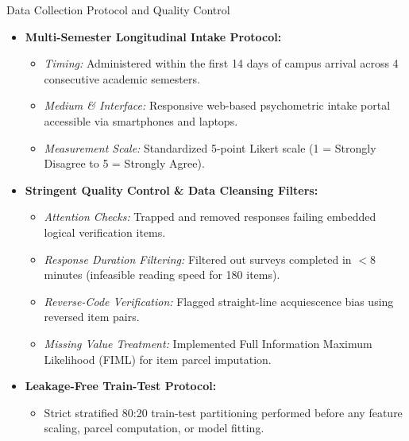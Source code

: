 \documentclass{beamer}
\begin{document}
\begin{frame}[t]{Data Collection Protocol and Quality Control}
  \begin{itemize}\setlength{\itemsep}{6pt}\small
    \item \textbf{Multi-Semester Longitudinal Intake Protocol:}
    \begin{itemize}\setlength{\itemsep}{2pt}\footnotesize
      \item \textit{Timing:} Administered within the first 14 days of campus arrival across 4 consecutive academic semesters.
      \item \textit{Medium \& Interface:} Responsive web-based psychometric intake portal accessible via smartphones and laptops.
      \item \textit{Measurement Scale:} Standardized 5-point Likert scale (1 = Strongly Disagree to 5 = Strongly Agree).
    \end{itemize}
    \item \textbf{Stringent Quality Control \& Data Cleansing Filters:}
    \begin{itemize}\setlength{\itemsep}{2pt}\footnotesize
      \item \textit{Attention Checks:} Trapped and removed responses failing embedded logical verification items.
      \item \textit{Response Duration Filtering:} Filtered out surveys completed in $< 8$ minutes (infeasible reading speed for 180 items).
      \item \textit{Reverse-Code Verification:} Flagged straight-line acquiescence bias using reversed item pairs.
      \item \textit{Missing Value Treatment:} Implemented Full Information Maximum Likelihood (FIML) for item parcel imputation.
    \end{itemize}
    \item \textbf{Leakage-Free Train-Test Protocol:}
    \begin{itemize}\setlength{\itemsep}{2pt}\footnotesize
      \item Strict stratified 80:20 train-test partitioning performed before any feature scaling, parcel computation, or model fitting.
    \end{itemize}
  \end{itemize}
\end{frame}

\end{document}
